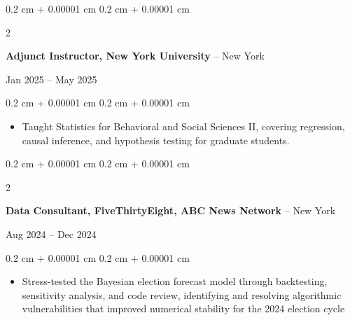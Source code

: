 \documentclass[10pt, letterpaper]{article}
\newenvironment{highlights}{
    \begin{itemize}[
        topsep=0.10 cm,
        parsep=0.10 cm,
        partopsep=0pt,
        itemsep=0pt,
        leftmargin=0.4 cm + 10pt
    ]
}{
    \end{itemize}
} %
\newenvironment{onecolentry}{
    \begin{adjustwidth}{
        0.2 cm + 0.00001 cm
    }{
        0.2 cm + 0.00001 cm
    }
}{
    \end{adjustwidth}
} %
\newenvironment{twocolentry}[2][]{
    \onecolentry
    \def\secondColumn{#2}
    \setcolumnwidth{\fill, 4.5 cm}
    \begin{paracol}{2}
}{
    \switchcolumn \raggedleft \secondColumn
    \end{paracol}
    \endonecolentry
} %
\begin{document}
        \begin{twocolentry}{Jan 2025 -- May 2025}
            \textbf{Adjunct Instructor, New York University} -- New York
        \end{twocolentry}
        \begin{onecolentry}
            \begin{highlights}
            \vspace{0.05 cm}
                \item Taught Statistics for Behavioral and Social Sciences II, covering regression, causal inference, and hypothesis testing for graduate students.
            \end{highlights}
        \end{onecolentry}

        \begin{twocolentry}{Aug 2024 -- Dec 2024}
            \textbf{Data Consultant, FiveThirtyEight, ABC News Network} -- New York
        \end{twocolentry}
        \begin{onecolentry}
            \begin{highlights}
            \vspace{0.05 cm}
                \item Stress-tested the Bayesian election forecast model through backtesting, sensitivity analysis, and code review, identifying and resolving algorithmic vulnerabilities that improved numerical stability for the 2024 election cycle
            \end{highlights}
        \end{onecolentry}
\end{document}
